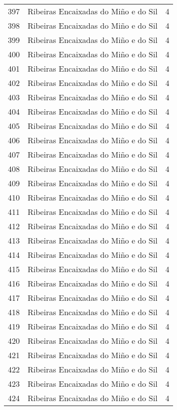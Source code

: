 \begin{table}[p]
\begin{tabular}{rlr}
  397 & Ribeiras Encaixadas do Miño e do Sil &   4 \\ 
  398 & Ribeiras Encaixadas do Miño e do Sil &   4 \\ 
  399 & Ribeiras Encaixadas do Miño e do Sil &   4 \\ 
  400 & Ribeiras Encaixadas do Miño e do Sil &   4 \\ 
  401 & Ribeiras Encaixadas do Miño e do Sil &   4 \\ 
  402 & Ribeiras Encaixadas do Miño e do Sil &   4 \\ 
  403 & Ribeiras Encaixadas do Miño e do Sil &   4 \\ 
  404 & Ribeiras Encaixadas do Miño e do Sil &   4 \\ 
  405 & Ribeiras Encaixadas do Miño e do Sil &   4 \\ 
  406 & Ribeiras Encaixadas do Miño e do Sil &   4 \\ 
  407 & Ribeiras Encaixadas do Miño e do Sil &   4 \\ 
  408 & Ribeiras Encaixadas do Miño e do Sil &   4 \\ 
  409 & Ribeiras Encaixadas do Miño e do Sil &   4 \\ 
  410 & Ribeiras Encaixadas do Miño e do Sil &   4 \\ 
  411 & Ribeiras Encaixadas do Miño e do Sil &   4 \\ 
  412 & Ribeiras Encaixadas do Miño e do Sil &   4 \\ 
  413 & Ribeiras Encaixadas do Miño e do Sil &   4 \\ 
  414 & Ribeiras Encaixadas do Miño e do Sil &   4 \\ 
  415 & Ribeiras Encaixadas do Miño e do Sil &   4 \\ 
  416 & Ribeiras Encaixadas do Miño e do Sil &   4 \\ 
  417 & Ribeiras Encaixadas do Miño e do Sil &   4 \\ 
  418 & Ribeiras Encaixadas do Miño e do Sil &   4 \\ 
  419 & Ribeiras Encaixadas do Miño e do Sil &   4 \\ 
  420 & Ribeiras Encaixadas do Miño e do Sil &   4 \\ 
  421 & Ribeiras Encaixadas do Miño e do Sil &   4 \\ 
  422 & Ribeiras Encaixadas do Miño e do Sil &   4 \\ 
  423 & Ribeiras Encaixadas do Miño e do Sil &   4 \\ 
  424 & Ribeiras Encaixadas do Miño e do Sil &   4 \\ 

\end{tabular}
\end{table}
